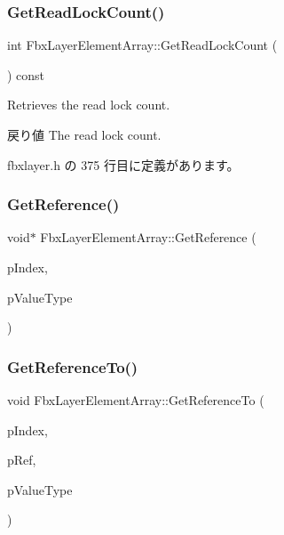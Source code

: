 \subsubsection{\texorpdfstring{Get\+Read\+Lock\+Count()}{GetReadLockCount()}}
{\footnotesize\ttfamily int Fbx\+Layer\+Element\+Array\+::\+Get\+Read\+Lock\+Count (\begin{DoxyParamCaption}{ }\end{DoxyParamCaption}) const\hspace{0.3cm}{\ttfamily [inline]}}

Retrieves the read lock count. \begin{DoxyReturn}{戻り値}
The read lock count. 
\end{DoxyReturn}


 fbxlayer.\+h の 375 行目に定義があります。

\mbox{\label{class_fbx_layer_element_array_a310ca26651e00014d24f9b70d8a0ef00}} 
\subsubsection{\texorpdfstring{Get\+Reference()}{GetReference()}}
{\footnotesize\ttfamily void$\ast$ Fbx\+Layer\+Element\+Array\+::\+Get\+Reference (\begin{DoxyParamCaption}\item[{int}]{p\+Index,  }\item[{\hyperlink{fbxpropertytypes_8h_a73913a5ddfb20e57c6f25e9e6784bd92}{E\+Fbx\+Type}}]{p\+Value\+Type }\end{DoxyParamCaption})\hspace{0.3cm}{\ttfamily [protected]}}

\mbox{\label{class_fbx_layer_element_array_a395c044fcc5c47c6c48bb799b0a70a60}} 
\subsubsection{\texorpdfstring{Get\+Reference\+To()}{GetReferenceTo()}}
{\footnotesize\ttfamily void Fbx\+Layer\+Element\+Array\+::\+Get\+Reference\+To (\begin{DoxyParamCaption}\item[{int}]{p\+Index,  }\item[{void $\ast$$\ast$}]{p\+Ref,  }\item[{\hyperlink{fbxpropertytypes_8h_a73913a5ddfb20e57c6f25e9e6784bd92}{E\+Fbx\+Type}}]{p\+Value\+Type }\end{DoxyParamCaption})\hspace{0.3cm}{\ttfamily [protected]}}

